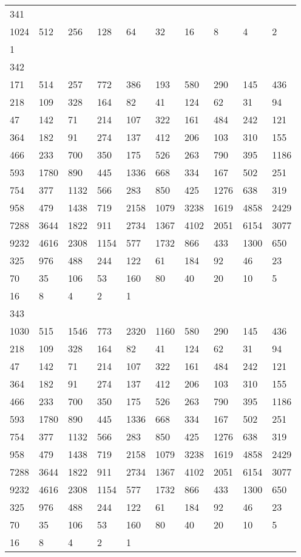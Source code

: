 \begin{longtable}{*{10}{l}}
341&&&&&&&&&\\
1024& 512& 256& 128& 64& 32& 16& 8& 4& 2\\
1& \\

342&&&&&&&&&\\
171& 514& 257& 772& 386& 193& 580& 290& 145& 436\\
218& 109& 328& 164& 82& 41& 124& 62& 31& 94\\
47& 142& 71& 214& 107& 322& 161& 484& 242& 121\\
364& 182& 91& 274& 137& 412& 206& 103& 310& 155\\
466& 233& 700& 350& 175& 526& 263& 790& 395& 1186\\
593& 1780& 890& 445& 1336& 668& 334& 167& 502& 251\\
754& 377& 1132& 566& 283& 850& 425& 1276& 638& 319\\
958& 479& 1438& 719& 2158& 1079& 3238& 1619& 4858& 2429\\
7288& 3644& 1822& 911& 2734& 1367& 4102& 2051& 6154& 3077\\
9232& 4616& 2308& 1154& 577& 1732& 866& 433& 1300& 650\\
325& 976& 488& 244& 122& 61& 184& 92& 46& 23\\
70& 35& 106& 53& 160& 80& 40& 20& 10& 5\\
16& 8& 4& 2& 1& \\

343&&&&&&&&&\\
1030& 515& 1546& 773& 2320& 1160& 580& 290& 145& 436\\
218& 109& 328& 164& 82& 41& 124& 62& 31& 94\\
47& 142& 71& 214& 107& 322& 161& 484& 242& 121\\
364& 182& 91& 274& 137& 412& 206& 103& 310& 155\\
466& 233& 700& 350& 175& 526& 263& 790& 395& 1186\\
593& 1780& 890& 445& 1336& 668& 334& 167& 502& 251\\
754& 377& 1132& 566& 283& 850& 425& 1276& 638& 319\\
958& 479& 1438& 719& 2158& 1079& 3238& 1619& 4858& 2429\\
7288& 3644& 1822& 911& 2734& 1367& 4102& 2051& 6154& 3077\\
9232& 4616& 2308& 1154& 577& 1732& 866& 433& 1300& 650\\
325& 976& 488& 244& 122& 61& 184& 92& 46& 23\\
70& 35& 106& 53& 160& 80& 40& 20& 10& 5\\
16& 8& 4& 2& 1& \\


\end{longtable}
